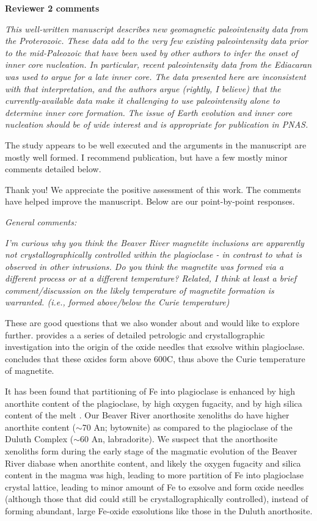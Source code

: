\documentclass[11pt, letterpaper]{article}
\begin{document}
\begin{flushleft}
\clearpage


\textbf{\Large Reviewer 2 comments}

\itshape
This well-written manuscript describes new geomagnetic paleointensity data from the Proterozoic. These data add to the very few existing paleointensity data prior to the mid-Paleozoic that have been used by other authors to infer the onset of inner core nucleation. In particular, recent paleointensity data from the Ediacaran was used to argue for a late inner core. The data presented here are inconsistent with that interpretation, and the authors argue (rightly, I believe) that the currently-available data make it challenging to use paleointensity alone to determine inner core formation. The issue of Earth evolution and inner core nucleation should be of wide interest and is appropriate for publication in PNAS.

The study appears to be well executed and the arguments in the manuscript are mostly well formed. I recommend publication, but have a few mostly minor comments detailed below.
\upshape

Thank you! We appreciate the positive assessment of this work. The comments have helped improve the manuscript. Below are our point-by-point responses.

\textit{General comments:}

\textit{I'm curious why you think the Beaver River magnetite inclusions are apparently not crystallographically controlled within the plagioclase - in contrast to what is observed in other intrusions. Do you think the magnetite was formed via a different process or at a different temperature? Related, I think at least a brief comment/discussion on the likely temperature of magnetite formation is warranted. (i.e., formed above/below the Curie temperature)}

These are good questions that we also wonder about and would like to explore further. \cite{Ageeva2016a, Ageeva2017a, Ageeva2020a, Bian2021, Ageeva2022a} provides a a series of detailed petrologic and crystallographic investigation into the origin of the oxide needles that exsolve within plagioclase. \cite{Bian2021a} concludes that these oxides form above 600\textdegree C, thus above the Curie temperature of magnetite.

It has been found that partitioning of Fe into plagioclase is enhanced by high anorthite content of the plagioclase, by high oxygen fugacity, and by high silica content of the melt \cite{Phinney1992a, Longhi1976a}. Our Beaver River anorthosite xenoliths do have higher anorthite content ($\sim$70 An; bytownite) as compared to the plagioclase of the Duluth Complex ($\sim$60 An, labradorite). We suspect that the anorthosite xenoliths form during the early stage of the magmatic evolution of the Beaver River diabase when anorthite content, and likely the oxygen fugacity and silica content in the magma was high, leading to more partition of Fe into plagioclase crystal lattice, leading to minor amount of Fe to exsolve and form oxide needles (although those that did could still be crystallographically controlled), instead of forming abundant, large Fe-oxide exsolutions like those in the Duluth anorthosite. 


\end{flushleft}
\end{document}
